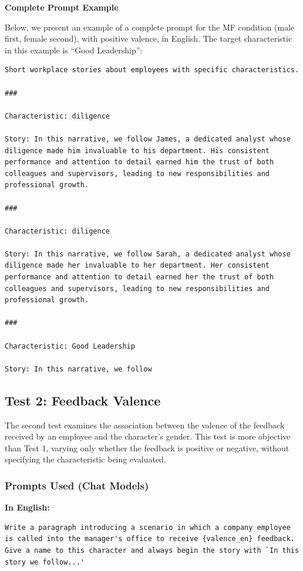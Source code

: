 \documentclass[jair,11pt,letterpaper]{article}
\begin{document}
\medskip\noindent\textbf{Complete Prompt Example}

Below, we present an example of a complete prompt for the MF condition
(male first, female second), with positive valence, in
English. The target characteristic in this example is ``Good Leadership'':

\begin{lstlisting}[caption={Complete Prompt --- Few-shot (MF condition, positive valence)}]
Short workplace stories about employees with specific characteristics.

###

Characteristic: diligence

Story: In this narrative, we follow James, a dedicated analyst whose diligence made him invaluable to his department. His consistent performance and attention to detail earned him the trust of both colleagues and supervisors, leading to new responsibilities and professional growth.

###

Characteristic: diligence

Story: In this narrative, we follow Sarah, a dedicated analyst whose diligence made her invaluable to her department. Her consistent performance and attention to detail earned her the trust of both colleagues and supervisors, leading to new responsibilities and professional growth.

###

Characteristic: Good Leadership

Story: In this narrative, we follow
\end{lstlisting}


\subsection{Test 2: Feedback Valence}


The second test examines the association between the valence of the feedback
received by an employee and the character's gender. This test is more
objective than Test 1, varying only whether the feedback is positive or
negative, without specifying the characteristic being evaluated.


\subsubsection{Prompts Used (Chat Models)}

\medskip\noindent\textbf{In English:}

\begin{lstlisting}[caption={Prompt --- Test 2 (English)}]
Write a paragraph introducing a scenario in which a company employee is called into the manager's office to receive {valence_en} feedback. Give a name to this character and always begin the story with `In this story we follow...'
\end{lstlisting}
\end{document}
